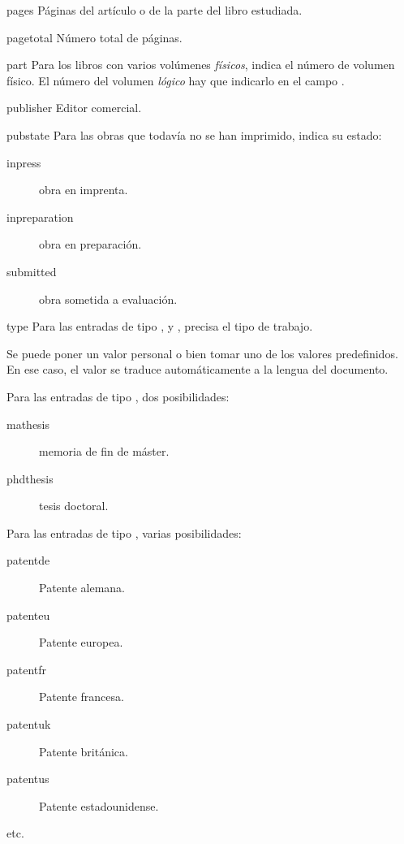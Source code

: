 \begin{choix}
	\item[pages] Páginas del artículo o de la parte del libro estudiada.
	\item[pagetotal] Número total de páginas.
   	\item[part] Para los libros con varios volúmenes
          \emph{físicos}, indica el número de volumen físico. El
          número del volumen  \emph{lógico} hay que indicarlo en el campo .
   	\item[publisher] Editor comercial.
   	\item[pubstate] Para las obras que todavía no se han
          imprimido, indica su estado:
					\begin{description}
						\item[inpress]obra en imprenta.
						\item[inpreparation]obra en preparación.
						\item[submitted]obra sometida a evaluación.
					\end{description}


   	\item[type] Para las entradas de tipo  ,
           y , precisa el tipo de trabajo.

	Se puede poner un valor personal o bien tomar uno de los
        valores predefinidos. En ese caso, el valor se traduce
        automáticamente a la lengua del documento.

	 Para las entradas de tipo , dos posibilidades:
					\begin{description}
						\item[mathesis]memoria
                                                  de fin de máster.
						\item[phdthesis]tesis doctoral.
					\end{description}

					Para las entradas de tipo
                                        , varias posibilidades:


					 \begin{description}
						\item[patentde]
                                                  Patente alemana.
						\item[patenteu]
                                                  Patente europea.
						\item[patentfr]
                                                  Patente francesa.
						\item[patentuk]
                                                  Patente británica.
						\item[patentus]
                                                  Patente estadounidense.
						\item[etc.]
					 \end{description}


\end{choix}
